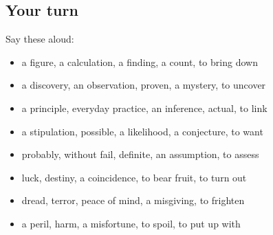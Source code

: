 \subsection*{Your turn}
Say these aloud:

\begin{itemize}
\raggedright
  \item a figure, a calculation, a finding, a count, to bring down
  \item a discovery, an observation, proven, a mystery, to uncover
  \item a principle, everyday practice, an inference, actual, to link
  \item a stipulation, possible, a likelihood, a conjecture, to want
  \item probably, without fail, definite, an assumption, to assess
  \item luck, destiny, a coincidence, to bear fruit, to turn out
  \item dread, terror, peace of mind, a misgiving, to frighten
  \item a peril, harm, a misfortune, to spoil, to put up with
\end{itemize}

